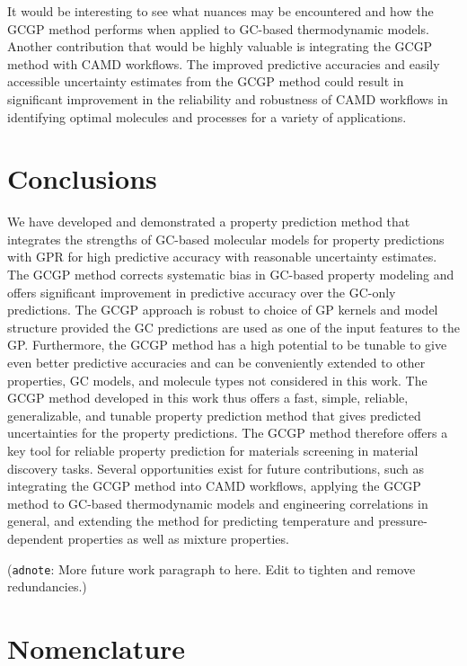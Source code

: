 \documentclass[journal=jacsat,manuscript=article]{achemso}
\newcommand{\adnote}[1]{{\color{OliveGreen} (\texttt{adnote}: #1)}}
\begin{document}
It would be interesting to see what nuances may be encountered and how the GCGP method performs when applied to GC-based thermodynamic models.
Another contribution that would be highly valuable is integrating the GCGP method with CAMD workflows. The improved predictive accuracies and easily accessible uncertainty estimates from the GCGP method could result in significant improvement in the reliability and robustness of CAMD workflows in identifying optimal molecules and processes for a variety of applications.


\section{Conclusions}
We have developed and demonstrated a property prediction method that integrates the strengths of GC-based molecular models for property predictions with GPR for high predictive accuracy with reasonable uncertainty estimates. The GCGP method corrects systematic bias in GC-based property modeling and offers significant improvement in predictive accuracy over the GC-only predictions. The GCGP approach is robust to choice of GP kernels and model structure provided the GC predictions are used as one of the input features to the GP. Furthermore, the GCGP method has a high potential to be tunable to give even better predictive accuracies and can be conveniently extended to other properties, GC models, and molecule types not considered in this work. 
The GCGP method developed in this work thus offers a fast, simple, reliable, generalizable, and tunable property prediction method that gives predicted uncertainties for the property predictions. The GCGP method therefore offers a key tool for reliable property prediction for materials screening in material discovery tasks. 
Several opportunities exist for future contributions, such as integrating the GCGP method into CAMD workflows, applying the GCGP method to GC-based thermodynamic models and engineering correlations in general, and extending the method for predicting temperature and pressure-dependent properties as well as mixture properties.

\adnote{More future work paragraph to here. Edit to tighten and remove redundancies.}


\section{Nomenclature}
\end{document}
